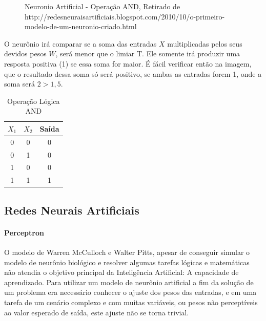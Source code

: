 \documentclass[	12pt, Times, openright, twoside, a4paper, english, brazil]{abntex2}
\begin{document}
            \begin{figure}[!ht]
              \caption{Neuronio Artificial - Operação AND, Retirado de http://redesneuraisartificiais.blogspot.com/2010/10/o-primeiro-modelo-de-um-neuronio-criado.html\label{fig:NeuronioArtificialAnd}}
            \end{figure}

           O neurônio irá comparar se a soma das entradas $X$ multiplicadas pelos seus devidos pesos $W$, será menor que o limiar T. Ele somente irá produzir uma resposta positiva (1) se essa soma for maior. É fácil verificar então na imagem, que o resultado dessa soma só será positivo, se ambas as entradas forem 1, onde a soma será $2>1,5$.

            \begin{table}[!ht]
            \centering
            \caption{Operação Lógica AND} \label{tab:and}
              \begin{tabular}{|c|c|c|}
                  \hline  \textbf{$X_1$} & \textbf{$X_2$} &  \textbf{Saída}\\
                  \hline 0 & 0 & 0\\
                  \hline 0 & 1 & 0\\
                  \hline 1 & 0 & 0\\
                  \hline 1 & 1 & 1\\
                  \hline 
              \end{tabular}
            \end{table}

        \subsection{Redes Neurais Artificiais}
          \paragraph*{Perceptron}
            O modelo de Warren McCulloch e Walter Pitts, apesar de conseguir simular o modelo de neurônio biológico e resolver algumas tarefas lógicas e matemáticas não atendia o objetivo principal da Inteligência Artificial: A capacidade de aprendizado.
            Para utilizar um modelo de neurônio artificial a fim da solução de um problema era necessário conhecer o ajuste dos pesos das entradas, e em uma tarefa de um cenário complexo e com muitas variáveis, ou pesos não perceptíveis ao valor esperado de saída, este ajuste não se torna trivial.
            
\end{document}
